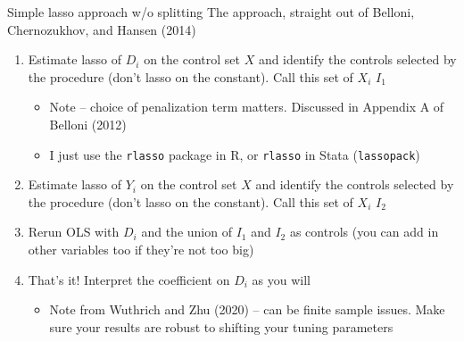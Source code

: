 \documentclass[notes,11pt, aspectratio=169]{beamer}
\begin{document}
\begin{frame}{Simple lasso approach w/o splitting}
  The approach, straight out of Belloni, Chernozukhov, and Hansen (2014)
  \begin{enumerate}
  \item Estimate lasso of $D_{i}$ on the control set $X$ and identify
    the controls selected by the procedure (don't lasso on the
    constant). Call this set of $X_{i}$ $I_{1}$
    \begin{itemize}
    \item Note -- choice of penalization term matters. Discussed in Appendix A of Belloni (2012)
    \item I just use the \texttt{rlasso} package in R, or \texttt{rlasso} in Stata (\texttt{lassopack})
    \end{itemize}
  \item Estimate lasso of $Y_{i}$ on the control set $X$ and identify
    the controls selected by the procedure (don't lasso on the
    constant). Call this set of $X_{i}$ $I_{2}$ 
  \item Rerun OLS with $D_{i}$ and the union of $I_{1}$ and $I_{2}$ as
    controls (you can add in other variables too if they're not too
    big)
  \item That's it! Interpret the coefficient on $D_{i}$ as you will
    \begin{itemize}
    \item Note from Wuthrich and Zhu (2020) -- can be finite sample
      issues. Make sure your results are robust to shifting your
      tuning parameters
    \end{itemize}
  \end{enumerate}
\end{frame}
\end{document}
